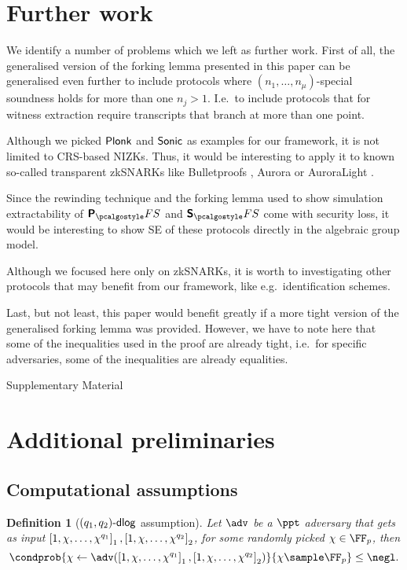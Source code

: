 \let\accentvec\vec \documentclass[runningheads]{llncs}
\newtheorem{definition}[theorem]{Definition}
\begin{document}
\section{Further work}
We identify a number of problems which we left as further work. First of all,
the generalised version of the forking lemma presented in this paper can be
generalised even further to include protocols where $(n_1, \ldots,
n_\mu)$-special soundness holds for more than one $n_j > 1$. I.e.~to include
protocols that for witness extraction require transcripts that branch at more
than one point.

Although we picked $\textnormal{\textsf{Plonk}}$ and ${\textnormal{\textsf{Sonic}}}$ as examples for our framework, it is
not limited to CRS-based NIZKs. Thus, it would be interesting to apply it to
known so-called transparent zkSNARKs like Bulletproofs \cite{SP:BBBPWM18},
Aurora \cite{EC:BCRSVW19} or AuroraLight \cite{EPRINT:Gabizon19a}.

Since the rewinding technique and the forking lemma used to show simulation
extractability of $\plonkprotfs$ and $\sonicprotfs$ come with security loss,
it would be interesting to show SE of these protocols directly in the
algebraic group model.

Although we focused here only on zkSNARKs, it is worth to
investigating other protocols that may benefit from our framework, like
e.g.~identification schemes.

Last, but not least, this paper would benefit greatly if a more tight version
of the generalised forking lemma was provided. However, we have to note here
that some of the inequalities used in the proof are already tight, i.e.~for
specific adversaries, some of the inequalities are already equalities.


\clearpage
\appendix
{\Huge{Supplementary Material}}

\section{Additional preliminaries}
\label{sec:additional_preliminaries}
\subsection{Computational assumptions}

\begin{definition}[$(q_1, q_2)\text{-}\mathsf{dlog}$ assumption]
	Let $\adv$ be a $\ppt$ adversary that gets as input $\left[1, \chi, \ldots, \chi^{q_1}\right]_{1}, \left[1, \chi, \ldots, \chi^{q_2}\right]_{2}$, for some randomly picked $\chi \in \FF_p$, then
	\[
		\condprob{\chi \gets \adv(\gone{1, \chi, \ldots, \chi^{q_1}}, \gtwo{1, \chi, \ldots, \chi^{q_2} })}{\chi \sample \FF_p} \leq \negl.
	\]
\end{definition}
\end{document}
